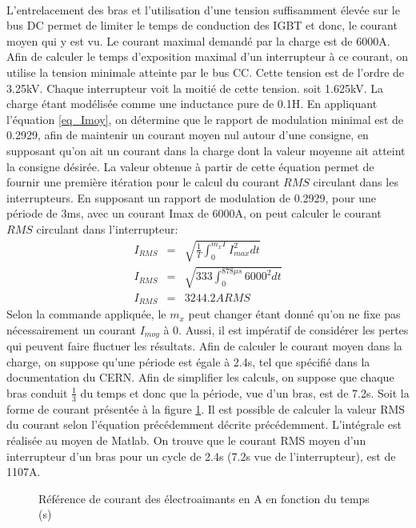 \paragraph{}L'entrelacement des bras et l'utilisation d'une tension suffisamment élevée sur le bus DC permet de limiter le temps de conduction des IGBT et donc, le courant moyen qui y est vu. Le courant maximal demandé par la charge est de 6000A. Afin de calculer le temps d'exposition maximal d'un interrupteur à ce courant, on utilise la tension minimale atteinte par le bus CC. Cette tension est de l'ordre de 3.25kV. Chaque interrupteur voit la moitié de cette tension. soit 1.625kV. La charge étant modélisée comme une inductance pure de 0.1H. En appliquant l'équation \ref{eq_Imoy}, on détermine que le rapport de modulation minimal est de 0.2929, afin de maintenir un courant moyen nul autour d'une consigne, en supposant qu'on ait un courant dans la charge dont la valeur moyenne ait atteint la consigne désirée. La valeur obtenue à partir de cette équation permet de fournir une première itération pour le calcul du courant $RMS$ circulant dans les interrupteurs. En supposant un rapport de modulation de 0.2929, pour une période de 3ms, avec un courant Imax de 6000A, on peut calculer le courant $RMS$ circulant dans l'interrupteur:
\begin{eqnarray}
I_{RMS} &=& \sqrt{\frac{1}{T}\int_0^{m_xT}I_{max}^2 dt}\\
I_{RMS} &=& \sqrt{333\int_0^{878\mu s}6000^2 dt}\\
I_{RMS} &=& 3244.2A RMS
\end{eqnarray}
Selon la commande appliquée, le $m_x$ peut changer étant donné qu'on ne fixe pas nécessairement un courant $I_{moy}$ à 0. Aussi, il est impératif de considérer les pertes qui peuvent faire fluctuer les résultats. Afin de calculer le courant moyen dans la charge, on suppose qu'une période est égale à 2.4s, tel que spécifié dans la documentation du CERN. Afin de simplifier les calculs, on suppose que chaque bras conduit $\frac{1}{3}$ du temps et donc que la période, vue d'un bras, est de 7.2s. Soit la forme de courant présentée à la figure \ref{fig_ref_courant}. Il est possible de calculer la valeur RMS du courant selon l'équation précédemment décrite précédemment. L'intégrale est réalisée au moyen de Matlab. On trouve que le courant RMS moyen d'un interrupteur d'un bras pour un cycle de 2.4s (7.2s vue de l'interrupteur), est de 1107A. 

\begin{figure}[htb]
\caption{Référence de courant des électroaimants en A en fonction du temps (s)}
\label{fig_ref_courant}
\end{figure}

